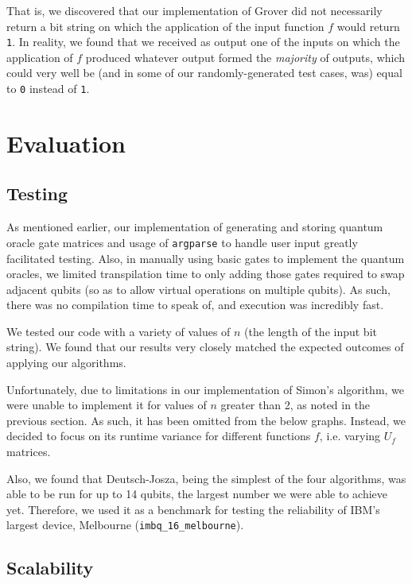 \documentclass[12pt]{article}
\begin{document}
That is, we discovered that our implementation of Grover did not necessarily return a bit string on which the application of the input function $f$ would return \texttt{1}.
In reality, we found that we received as output one of the inputs on which the application of $f$ produced whatever output formed the \textit{majority} of outputs, which could very well be (and in some of our randomly-generated test cases, was) equal to \texttt{0} instead of \texttt{1}.

\section{Evaluation}

\subsection{Testing}

As mentioned earlier, our implementation of generating and storing quantum oracle gate matrices and usage of \texttt{argparse} to handle user input greatly facilitated testing.
Also, in manually using basic gates to implement the quantum oracles, we limited transpilation time to only adding those gates required to swap adjacent qubits (so as to allow virtual operations on multiple qubits).
As such, there was no compilation time to speak of, and execution was incredibly fast.

We tested our code with a variety of values of $n$ (the length of the input bit string).
We found that our results very closely matched the expected outcomes of applying our algorithms.

Unfortunately, due to limitations in our implementation of Simon's algorithm, we were unable to implement it for values of $n$ greater than 2, as noted in the previous section.
As such, it has been omitted from the below graphs.
Instead, we decided to focus on its runtime variance for different functions $f$, i.e. varying $U_f$ matrices.

Also, we found that Deutsch-Josza, being the simplest of the four algorithms, was able to be run for up to 14 qubits, the largest number we were able to achieve yet.
Therefore, we used it as a benchmark for testing the reliability of IBM's largest device, Melbourne (\texttt{imbq\_16\_melbourne}).

\subsection{Scalability}\label{section:scale}
\end{document}
